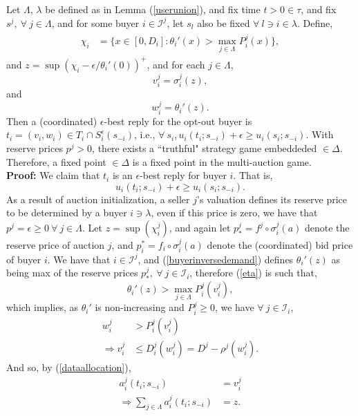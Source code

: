 \documentclass[sigconf, anonymous]{acmart}
\newcommand{\mcI}{\mathcal{I}}
\newcommand{\g}{\sigma}
\theoremstyle{definition}
\begin{document}
{
\label{incentive}
Let $\Lambda$, $\lambda$ be defined as in Lemma (\ref{userunion}), and fix time
$t>0 \in \tau$, and fix $s^j, \ \forall \ j\in\Lambda$, and for some
buyer $i\in \mcI^j$, let $s_l$ also be fixed $\forall \ l\ni i \in \lambda$. Define,
\begin{align}
\begin{split}\label{eta}
    \chi_i &= \bigg\lbrace x\in [0,D_i] : 
 {\theta_i}'(x) > \max_{j\in\Lambda}P_i^j(x)\bigg\rbrace, 
\end{split}
\end{align}
and $z = \sup(\chi_i - \epsilon / \theta_i'(0))^+$, and for each $j \in
\Lambda$, 
$$
    v_i^j = \g_i^{j}(z),
$$
and 
$$
    w_i^j = \theta_i'(z).%
$$
Then a (coordinated) $\epsilon$-best reply for the opt-out buyer is $t_i =
(v_i,w_i) \in T_i\cap S_i^\epsilon(s_{-i})$, i.e., $\forall \ s_i, u_i(t_i;s_{-i}) + \epsilon \ge u_i(s_i;
s_{-i})$.
With reserve prices $p^j >0$, there exists a ``truthful" strategy game embeddeded
$\in\Delta$. Therefore, a fixed point $\in \Delta$ is a fixed point in
the multi-auction game. 
}\\
\textbf{Proof:}
We claim that $t_i$ is an $\epsilon$-best reply for buyer $i$. That is,
$$
    u_i(t_i;s_{-i}) + \epsilon \ge u_i(s_i;s_{-i}).
$$
As a result of auction initialization, a seller $j$'s valuation defines its
reserve price to be determined
by a buyer $i \ni \lambda$, even if this price is zero, we have that $p^j =
\epsilon \ge 0 \ \forall \ j \in\Lambda$.
Let $z = \sup(\chi_i^j)$, and again let $p_*^j = f^j \circ \g_i^j(a) $ denote the reserve
price of auction $j$, and $p_i^*= f_i \circ \g_i^j(a)$ denote the (coordinated) bid price of buyer $i$. 
We have that $i\in\mcI^j$, 
and (\ref{buyerinversedemand}) defines $\theta_i'(z)$ as being
max of the reserve prices $p_*^j,\ \forall \ j\in\mcI_i$, therefore
(\ref{eta}) is such that,
$$
    \theta_i'(z) > \max_{j\in\Lambda}P_i^j(v_i^j),
$$ 
which implies, as $\theta_i'$ is non-increasing and $P_i^j \ge 0$,
we have $\forall \ j \in \mcI_i$, 
\begin{align*}
    w_i^j &> P_i^j(v_i^j) \\
    \Rightarrow v_i^j &\le D_i^j(w_i^j) = D^j - \rho^j(w_i^j).
\end{align*}
And so, by (\ref{dataallocation}),
\begin{align*}
    a_i^j(t_i;s_{-i}) &= v_i^j \\
    \Rightarrow \displaystyle\sum_{j\in\Lambda} a_i^j(t_i;s_{-i}) &= z.
\end{align*}
\end{document}
